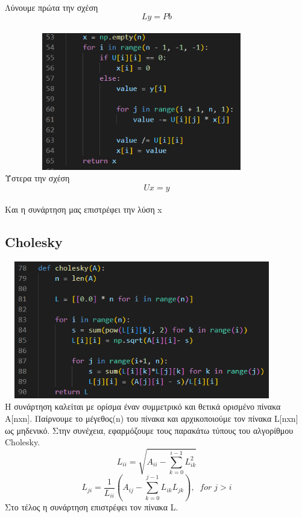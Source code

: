 \documentclass[a4paper,11pt]{article}
\newcommand{\lt}{\latintext}
\newcommand{\gt}{\greektext}
\begin{document}
\\
\normalsize{Λύνουμε πρώτα την σχέση}
\\
\begin{equation*}
	Ly = Pb
\end{equation*}
\\
\includegraphics[height=6cm, width=12cm]{x.png}
\\
\normalsize{Ύστερα την σχέση}
\\
\begin{equation*}
	Ux = y
\end{equation*}
\\
\normalsize{Και η συνάρτηση μας επιστρέφει την λύση \lt x}
\subsection{\lt Cholesky}
\includegraphics[height=6cm, width=12cm]{cholesky.png}
\\
\normalsize{Η συνάρτηση καλείται με ορίσμα έναν συμμετρικό και
θετικά ορισμένο πίνακα \lt
A[nxn]. \gt Παίρνουμε το μέγεθος\lt (n) \gt του πίνακα και
αρχικοποιούμε τον πίνακα \lt L[nxn] \gt ως μηδενικό. Στην συνέχεια,
εφαρμόζουμε τους παρακάτω τύπους του αλγορίθμου \lt Cholesky.} 
\\
	\begin{equation*}
L_{ii} = \sqrt{A_{ii}-\sum_{k=0}^{i-1}L^2_{ik}}
	\end{equation*}	
	\begin{equation*}
L_{ji} = \frac{1}{L_{ii}}(A_{ij}-\sum_{k=0}^{j-1}L_{ik}L_{jk}), 
    \; \;  for \; j>i
	\end{equation*}
	\normalsize{Στο τέλος η συνάρτηση επιστρέφει τον πίνακα \lt L.}
\end{document}
